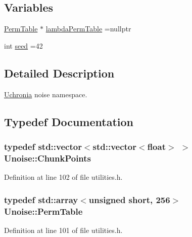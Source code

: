 \subsection*{Variables}
\begin{DoxyCompactItemize}
\item 
\hyperlink{namespace_unoise_ae11142038f2dd1bea2711b2b99bbfaf6}{Perm\-Table} $\ast$ \hyperlink{namespace_unoise_acf4515c07424188371eeb9cf77d34fb3}{lambda\-Perm\-Table} =nullptr
\item 
int \hyperlink{namespace_unoise_ae6356ffd0fec247f6d19c762e1757fc3}{seed} =42
\end{DoxyCompactItemize}


\subsection{Detailed Description}
\hyperlink{namespace_uchronia}{Uchronia} noise namespace. 

\subsection{Typedef Documentation}
\hypertarget{namespace_unoise_ac1e5c6227ab68e4e8c1ad57fdbddf51b}{
\subsubsection[{Chunk\-Points}]{\setlength{\rightskip}{0pt plus 5cm}typedef std\-::vector$<$std\-::vector$<$float$>$ $>$ {\bf Unoise\-::\-Chunk\-Points}}}\label{namespace_unoise_ac1e5c6227ab68e4e8c1ad57fdbddf51b}


Definition at line 102 of file utilities.\-h.

\hypertarget{namespace_unoise_ae11142038f2dd1bea2711b2b99bbfaf6}{
\subsubsection[{Perm\-Table}]{\setlength{\rightskip}{0pt plus 5cm}typedef std\-::array$<$unsigned short, 256$>$ {\bf Unoise\-::\-Perm\-Table}}}\label{namespace_unoise_ae11142038f2dd1bea2711b2b99bbfaf6}


Definition at line 101 of file utilities.\-h.



